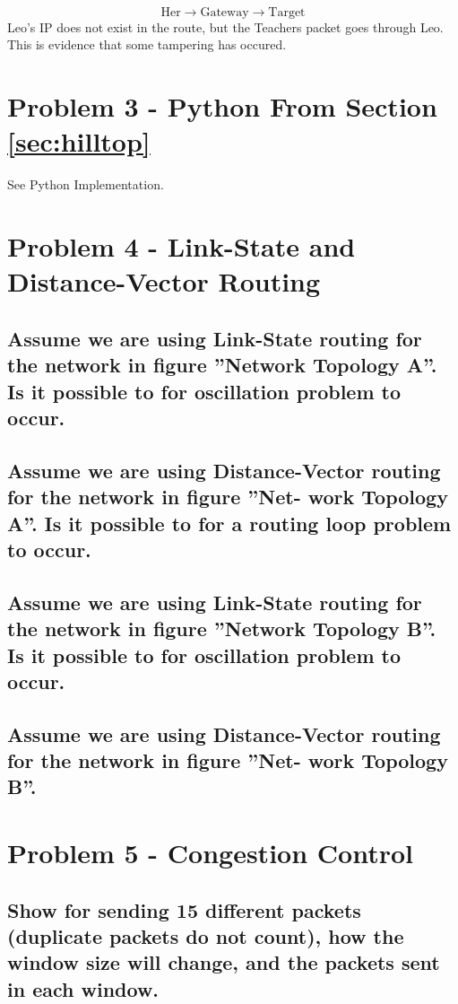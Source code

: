 \documentclass{article}
\begin{document}
	\[
		\text{Her} \xrightarrow{} \text{Gateway} \xrightarrow{} \text{Target}
	\]
	Leo's IP does not exist in the route, but the Teachers packet goes through Leo.
	This is evidence that some tampering has occured.

\section{Problem 3 - Python From Section \ref{sec:hilltop}}

See Python Implementation.

\section{Problem 4 - Link-State and Distance-Vector Routing}

\subsection{Assume we are using Link-State routing for the network in figure  ”Network
Topology A”. Is it possible to for oscillation problem to occur.}

\subsection{Assume we are using Distance-Vector routing for the network in figure ”Net-
work Topology A”. Is it possible to for a routing loop problem to occur.}

\subsection{Assume we are using Link-State routing for the network in figure ”Network
Topology B”. Is it possible to for oscillation problem to occur.}

\subsection{Assume we are using Distance-Vector routing for the network in figure ”Net-
work Topology B”.}

\section{Problem 5 - Congestion Control}

\subsection{Show for sending 15 different packets (duplicate packets do not count), how the
window size will change, and the packets sent in each window.}
\end{document}
